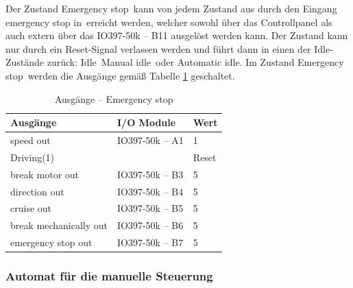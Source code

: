Der Zustand \frqq Emergency stop\flqq\ kann von jedem Zustand aus durch den Eingang \frqq emergency stop in\flqq\ erreicht werden, welcher sowohl über das Controllpanel als auch extern über das IO397-50k – B11 ausgelöst werden kann. Der Zustand kann nur durch ein Reset-Signal verlassen werden und führt dann in einen der Idle-Zustände zurück: \frqq Idle\flqq\ \frqq Manual idle\flqq\ oder \frqq Automatic idle\flqq. Im Zustand \frqq Emergency stop\flqq\ werden die Ausgänge gemäß Tabelle \ref{Automat_man:tab:z_Emergency_stop} geschaltet.


\pagebreak[1]
\begin{table}[!ht]
	\centering
	\caption{Ausgänge – Emergency stop}
	\label{Automat_man:tab:z_Emergency_stop}
	\begin{tabular}{lll}
		\hline
		\textbf{Ausgänge}                           & \textbf{I/O Module}                 & \textbf{Wert} \\ \hline
		\multicolumn{1}{l|}{speed out}              & \multicolumn{1}{l|}{IO397-50k – A1} & 1             \\
		\multicolumn{1}{l|}{Driving(1)}             & \multicolumn{1}{l|}{}               & Reset         \\
		\multicolumn{1}{l|}{break motor out}        & \multicolumn{1}{l|}{IO397-50k – B3} & 5             \\
		\multicolumn{1}{l|}{direction out}          & \multicolumn{1}{l|}{IO397-50k – B4} & 5             \\
		\multicolumn{1}{l|}{cruise out}             & \multicolumn{1}{l|}{IO397-50k – B5} & 5             \\
		\multicolumn{1}{l|}{break mechanically out} & \multicolumn{1}{l|}{IO397-50k – B6} & 5             \\
		\multicolumn{1}{l|}{emergency stop out}     & \multicolumn{1}{l|}{IO397-50k – B7} & 5             \\ \hline
	\end{tabular}
\end{table}
\pagebreak[1]










\subsubsection{Automat für die manuelle Steuerung}
\label{Automatensteuerung:Automat_man}

